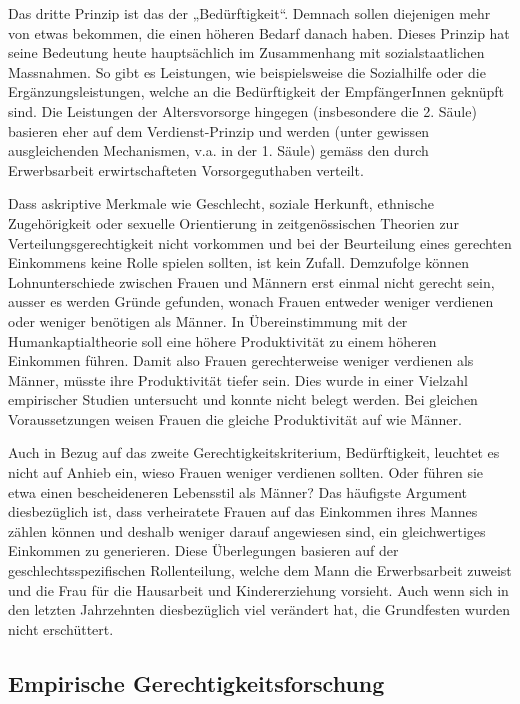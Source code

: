 \documentclass[a4paper,12pt]{article}
\renewcommand{\baselinestretch}{1.1}
\newif\ifcomments
\newcommand{\comment}[1]{%
    \ifcomments\marginpar{\renewcommand{\baselinestretch}{1}\tiny\hspace*{-1.1em}\colorbox{gray!20}%
    {\textcolor{red}{\parbox[t]{.9in}{\raggedright #1}}}}\fi}
\begin{document}
Das dritte Prinzip ist das der „Bedürftigkeit“. Demnach sollen diejenigen mehr
von etwas bekommen, die einen höheren Bedarf danach haben. Dieses Prinzip hat
seine Bedeutung heute hauptsächlich im Zusammenhang mit sozialstaatlichen
Massnahmen. So gibt es Leistungen, wie beispielsweise die Sozialhilfe oder die
Ergänzungsleistungen, welche an die Bedürftigkeit der EmpfängerInnen geknüpft
sind. Die Leistungen der Altersvorsorge hingegen (insbesondere die 2. Säule)
basieren eher auf dem Verdienst-Prinzip und werden (unter gewissen
ausgleichenden Mechanismen, v.a. in der 1. Säule) gemäss den durch
Erwerbsarbeit erwirtschafteten Vorsorgeguthaben verteilt.

Dass askriptive Merkmale wie Geschlecht, soziale Herkunft, ethnische
Zugehörigkeit oder sexuelle Orientierung in zeitgenössischen Theorien zur
Verteilungsgerechtigkeit nicht vorkommen und bei der Beurteilung eines
gerechten Einkommens keine Rolle spielen sollten, ist kein Zufall.
\comment{(ggfs. Begründung mit Rawls, „Schleier des Nichtwissens“ oder so;
Rawls 1979)} Demzufolge können Lohnunterschiede zwischen Frauen und
Männern erst einmal nicht gerecht sein, ausser es werden Gründe gefunden,
wonach Frauen entweder weniger verdienen oder weniger benötigen als Männer. In
Übereinstimmung mit der Humankaptialtheorie
\citep{Becker-1975,Mincer-Polachek-1974} soll eine höhere Produktivität zu
einem höheren Einkommen führen. Damit also Frauen gerechterweise weniger
verdienen als Männer, müsste ihre Produktivität tiefer sein. Dies wurde in
einer Vielzahl empirischer Studien untersucht und konnte nicht belegt werden.
Bei gleichen Voraussetzungen weisen Frauen die gleiche Produktivität auf wie
Männer.

Auch in Bezug auf das zweite Gerechtigkeitskriterium, Bedürftigkeit, leuchtet
es nicht auf Anhieb ein, wieso Frauen weniger verdienen sollten. Oder führen
sie etwa einen bescheideneren Lebensstil als Männer? Das häufigste Argument
diesbezüglich ist, dass verheiratete Frauen auf das Einkommen ihres Mannes
zählen können und deshalb weniger darauf angewiesen sind, ein gleichwertiges
Einkommen zu generieren. Diese Überlegungen basieren auf der
geschlechtsspezifischen Rollenteilung, welche dem Mann die Erwerbsarbeit
zuweist und die Frau für die Hausarbeit und Kindererziehung vorsieht. Auch wenn
sich in den letzten Jahrzehnten diesbezüglich viel verändert hat, die
Grundfesten wurden nicht erschüttert.
\comment{Hier evtl. etwas ergänzen.}

\subsection{Empirische Gerechtigkeitsforschung}
\end{document}
